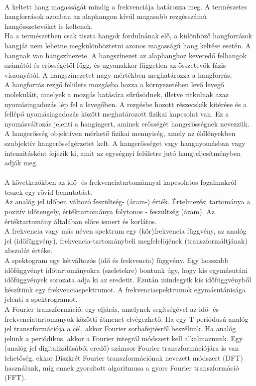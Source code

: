 \documentclass[a4paper,12pt]{paper}
\begin{document}
\\A keltett hang magasságát mindig a frekvenciája határozza meg. A természetes hangforrások azonban az alaphangon kívül magasabb rezgésszámú hangösszetevőket is keltenek.
\\Ha a természetben csak tiszta hangok fordulnának elő, a különböző hangforrások hangját nem lehetne megkülönböztetni azonos magasságú hang keltése esetén. A hangnak van hangszínezete. A hangszínezet az alaphanghoz keveredő felhangok számától és erősségétől függ, és ugyanakkor független az összetevők fázis viszonyától. A hangszínezetet nagy mértékben meghatározza a hangforrás.
\\A hangforrás rezgő felülete mozgásba hozza a környezetében levő levegő molekuláit, amelyek a mozgás hatására sűrűsödnek, illetve ritkulnak azaz nyomásingadozás lép fel a levegőben. A rezgésbe hozott részecskék kitérése és a fellépő nyomásingadozás között meghatározott fizikai kapcsolat van. Ez a nyomásváltozás jelenti a hangingert, aminek erősségét hangerősségnek nevezzük. A hangerősség objektíven mérhető fizikai mennyiség, amely az élőlényekben szubjektív hangerősségérzetet kelt. A hangerősséget vagy hangnyomásban vagy intenzitásként fejezik ki, amit az egységnyi felületre jutó hangteljesítményben adják meg.
\\\\A következőkben az idő- és frekvenciatartománnyal kapcsolatos fogalmakról teszek egy rövid bemutatást.
\\Az analóg jel időben változó feszültség- (áram-) érték. Értelmezési tartománya a pozitív időtengely, értéktartománya folytonos - feszültség (áram). Az értéktartomány általában előre ismert és korlátos. 
\\A frekvencia vagy más néven spektrum egy (kör)frekvencia függvény, az analóg jel (időfüggvény), frekvencia-tartománybeli megfelelőjének (transzformáltjának) abszolút értéke.
\\A spektogram egy kétváltozós (idő és frekvencia) függvény. Egy hosszabb időfüggvényt időtartományokra (szeletekre) bontunk úgy, hogy kis egymásutáni időfüggvények sorozata adja ki az eredetit. Ezután mindegyik kis időfüggvényből készítünk egy frekvenciaspektrumot. A frekvenciaspektrumok egymásutánisága jelenti a spektrogramot.
\\A Fourier transzformáció: egy eljárás, amelynek segítségével az idő- és frekvenciatartományok közötti átmenet elvégezhető. Ha egy T periódusú analóg jel transzformációja a cél, akkor Fourier sorbafejtésről beszélünk. Ha analóg jelünk a periódikus, akkor a Fourier integrál módszert kell alkalmaznunk. Egy (analóg jel digitalizálásából eredő) számsor Fourier transzformációjára is van lehetőség, ekkor Diszkrét Fourier transzformációnak nevezett módszert (DFT) használunk, míg ennek gyorsított algoritmusa a gyors Fourier transzformáció (FFT).
\end{document}
